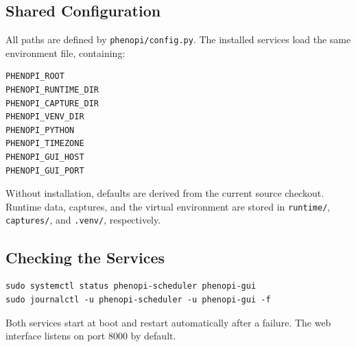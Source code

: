\subsection{Shared Configuration}

All paths are defined by \texttt{phenopi/config.py}. The installed services
load the same environment file, containing:

\begin{verbatim}
PHENOPI_ROOT
PHENOPI_RUNTIME_DIR
PHENOPI_CAPTURE_DIR
PHENOPI_VENV_DIR
PHENOPI_PYTHON
PHENOPI_TIMEZONE
PHENOPI_GUI_HOST
PHENOPI_GUI_PORT
\end{verbatim}

Without installation, defaults are derived from the current source checkout.
Runtime data, captures, and the virtual environment are stored in
\texttt{runtime/}, \texttt{captures/}, and \texttt{.venv/}, respectively.

\subsection{Checking the Services}

\begin{verbatim}
sudo systemctl status phenopi-scheduler phenopi-gui
sudo journalctl -u phenopi-scheduler -u phenopi-gui -f
\end{verbatim}

Both services start at boot and restart automatically after a failure. The web
interface listens on port 8000 by default.
